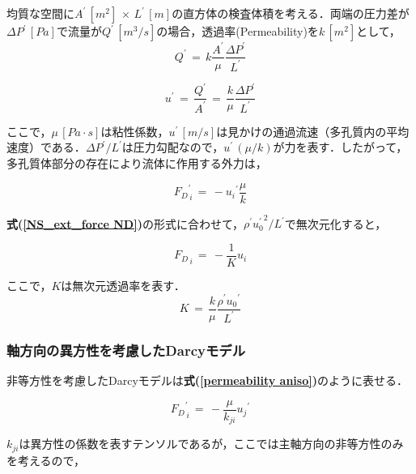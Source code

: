 均質な空間に$A^{\prime}\,[m^2]\,\times\,L^{\prime}\,[m]$の直方体の検査体積を考える．両端の圧力差が$\Delta P^{\prime} \,[Pa]$で流量が$Q^{\prime}\,[m^3/s]$の場合，透過率(Permeability)を$k\,[m^2]$として，
\begin{equation}
Q^{\prime} \,=\, k \frac{A^{\prime}}{\mu} \frac{\Delta P^{\prime}}{L^{\prime}}
\label{Darcy's law 1}
\end{equation}

\begin{equation}
u^{\prime} \,=\, \frac{Q^{\prime}}{A^{\prime}} \,=\, \frac{k}{\mu} \frac{\Delta P^{\prime}}{L^{\prime}}
\label{Darcy's law 2}
\end{equation}

ここで，$\mu\,[Pa \cdot s]$は粘性係数，$u^{\prime}\,[m/s]$は見かけの通過流速（多孔質内の平均速度）である．$\Delta P^{\prime}/L^{\prime}$は圧力勾配なので，$u^{\prime}\,(\mu/k)$が力を表す．したがって，多孔質体部分の存在により流体に作用する外力は，

\begin{equation}
{F_{D}}_{\,i}^{\prime} \,=\, - {u_{i}}^{\prime} \frac{\mu}{k}
\label{NS_darcy_force}
\end{equation}

\textbf{式(\ref{NS_ext_force ND})}の形式に合わせて，$\rho^{\prime} {u_{0}^{\prime}}^{2}/L^{\prime}$で無次元化すると，

\begin{equation}
{F_{D}}_{\,i} \,=\, - \frac{1}{K}{u_{i}}
\label{NS_darcy_force_ND}
\end{equation}

ここで，$K$は無次元透過率を表す．
\begin{equation}
K \,=\, \frac{k}{\mu} \frac{\rho^{\prime} {u_{0}}^{\prime}}{L^{\prime}}
\label{permeability ND}
\end{equation}


\subsubsection{軸方向の異方性を考慮したDarcyモデル}

非等方性を考慮したDarcyモデルは\textbf{式(\ref{permeability aniso})}のように表せる．

\begin{equation}
{F_{D}}_{\,i}^{\prime} \,=\, - \frac{\mu}{k_{ji}}{u_{j}}^{\prime}
\label{permeability aniso}
\end{equation}

$k_{ji}$は異方性の係数を表すテンソルであるが，ここでは主軸方向の非等方性のみを考えるので，

